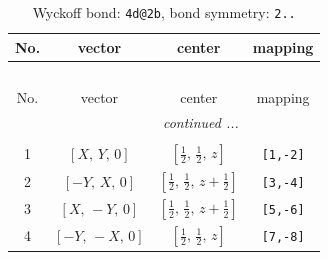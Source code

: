 \documentclass[fleqn,8pt]{jsarticle}
\begin{document}
\renewcommand{\arraystretch}{1.2}
\begin{longtable}{cccc}
\caption{Wyckoff bond: {\tt 4d@2b}, bond symmetry: {\tt 2..}}
 \\
 \hline \hline
No. & vector & center & mapping \\ \hline \endfirsthead

\multicolumn{3}{l}{\tablename\ \thetable{}} \\
 \hline \hline
No. & vector & center & mapping \\ \hline \endhead

 \hline \hline
\multicolumn{3}{r}{\footnotesize\it continued ...} \\ \endfoot

 \hline \hline
\multicolumn{3}{r}{} \\ \endlastfoot

1 & $\left[ X,\, Y,\, 0 \right]$ & $\left[ \frac{1}{2},\, \frac{1}{2},\, z \right]$ & {\tt [1,-2]} \\ \hline
2 & $\left[ - Y,\, X,\, 0 \right]$ & $\left[ \frac{1}{2},\, \frac{1}{2},\, z + \frac{1}{2} \right]$ & {\tt [3,-4]} \\ \hline
3 & $\left[ X,\, - Y,\, 0 \right]$ & $\left[ \frac{1}{2},\, \frac{1}{2},\, z + \frac{1}{2} \right]$ & {\tt [5,-6]} \\ \hline
4 & $\left[ - Y,\, - X,\, 0 \right]$ & $\left[ \frac{1}{2},\, \frac{1}{2},\, z \right]$ & {\tt [7,-8]} \\
\end{longtable}
\renewcommand{\arraystretch}{1.2}
\end{document}
